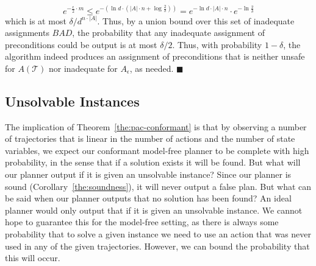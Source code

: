 \documentclass[letterpaper]{article}
\newenvironment{proof}{\noindent{\bf Proof:~~}}{\qed}
\newcommand{\qed}{\hfill\ensuremath{\blacksquare}}
\begin{document}
\begin{proof}
\begin{equation}
e^{-\frac{\epsilon}{2} \cdot m}
\leq 
e^{-(\ln d \cdot (|A|\cdot n+\log\frac{2}{\delta}))}
=e^{-\ln d \cdot |A|\cdot n}\cdot e^{-\ln  \frac{2}{\delta}}
\end{equation}
which is at most $\delta/d^{n\cdot |A|}$. Thus, by a union bound over this set of inadequate assignments $BAD$, the probability that any inadequate assignment of preconditions could be output is at most $\delta/2$.
Thus, with probability $1-\delta$, the algorithm indeed produces an assignment of preconditions that is neither unsafe for $A(\mathcal{T})$ nor inadequate for $A_\epsilon$, as needed.
\end{proof}

\subsection{Unsolvable Instances}

The implication of Theorem~\ref{the:pac-conformant} is that by observing 
a number of trajectories that is linear in the number of actions and the number of state variables, 
we expect our conformant model-free planner to be complete with high probability, in the sense that if a solution exists it will be found. But what will our planner output if it is given an unsolvable instance? Since our planner is sound (Corollary~\ref{the:soundness}), it will never output a false plan. But what can be said when our planner outputs that no solution has been found?
An ideal planner would only output that if it is given an unsolvable instance. We cannot hope to guarantee this for the model-free setting, as there is always some probability that to solve a given instance we need to use an action that was never used in any of the given trajectories. However, we can bound the probability that this will occur. 
\end{document}
